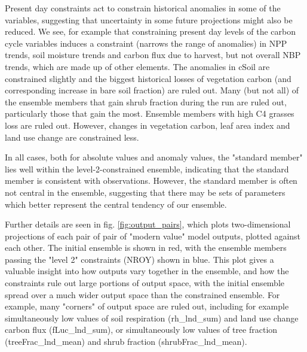 \documentclass[gmd, manuscript]{copernicus}
\begin{document}
Present day constraints act to constrain historical anomalies in some of the variables, suggesting that uncertainty in some future projections might also be reduced. We see, for example that constraining present day levels of the carbon cycle variables induces a constraint (narrows the range of anomalies) in NPP trends, soil moisture trends and carbon flux due to harvest, but not overall NBP trends, which are made up of other elements. The anomalies in cSoil are constrained slightly and the biggest historical losses of vegetation carbon (and corresponding increase in bare soil fraction) are ruled out. Many (but not all) of the ensemble members that gain shrub fraction during the run are ruled out, particularly those that gain the most. Ensemble members with high C4 grasses loss are ruled out. However, changes in vegetation carbon, leaf area index and land use change are constrained less.

In all cases, both for absolute values and anomaly values, the "standard member" lies well within the level-2-constrained ensemble, indicating that the standard member is consistent with observations. However, the standard member is often not central in the ensemble, suggesting that there may be sets of parameters which better represent the central tendency of our ensemble.

Further details are seen in fig. \ref{fig:output_pairs}, which plots two-dimensional projections of each pair of pair of "modern value" model outputs, plotted against each other. The initial ensemble is shown in red, with the ensemble members passing the "level 2" constraints (NROY) shown in blue. This plot gives a valuable insight into how outputs vary together in the ensemble, and how the constraints rule out large portions of output space, with the initial ensemble spread over a much wider output space than the constrained ensemble. For example, many "corners" of output space are ruled out, including for example simultaneously low values of soil respiration (rh\_lnd\_sum) and land use change carbon flux (fLuc\_lnd\_sum), or simultaneously low values of tree fraction (treeFrac\_lnd\_mean) and shrub fraction (shrubFrac\_lnd\_mean).
\end{document}
